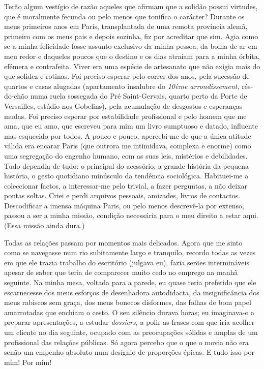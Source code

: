 Terão algum vestígio de razão aqueles que afirmam que a solidão possui
virtudes, que é moralmente fecunda ou pelo menos que tonifica o
carácter? Durante os meus primeiros anos em Paris, transplantada de uma
remota província alemã, primeiro com os meus pais e depois sozinha, fiz
por acreditar que sim. Agia como se a minha felicidade fosse assunto
exclusivo da minha pessoa, da bolha de ar em meu redor e daqueles
poucos que o destino e os dias atraíam para a minha órbita, efémera e
contrafeita. Viver era uma espécie de artesanato que não exigia mais do
que solidez e rotinas. Foi preciso esperar pelo correr dos anos, pela
sucessão de quartos e casas alugadas (apartamento insalubre do
\emph{10ème arrondissement, }rés-do-chão
numa ruela sossegada do Pré Saint-Gervais, quarto perto da Porte de
Versailles, estúdio nos Gobelins), pela acumulação de desgostos e
esperanças mudas. Foi preciso esperar por estabilidade profissional e
pelo homem que me ama, que eu amo, que escreveu para mim um livro
sumptuoso e datado, influente mas esquecido por todos. A pouco e pouco,
apercebi-me de que a única atitude válida era encarar Paris (que outrora me
intimidava, complexa e enorme) como uma segregação do engenho humano,
com as suas leis, mistérios e debilidades. Tudo dependia de tudo: o
principal do acessório, a grande história da pequena história, o gesto
quotidiano minúsculo da tendência sociológica. Habituei-me a coleccionar
factos, a interessar-me pelo trivial, a fazer perguntas, a não deixar
pontas soltas. Criei e perdi arquivos pessoais, amizades, livros de
contactos. Descodificar a imensa máquina Paris, ou pelo menos
descrevê-la por extenso, passou a ser a minha missão, condição
necessária para o meu direito a estar aqui. (Essa missão ainda dura.)

Todas as relações passam por momentos mais delicados. Agora que me sinto
como se navegasse num rio subitamente largo e tranquilo, recordo todas
as vezes em que ele trazia trabalho do escritório (julgava eu), fazia
serões intermináveis apesar de saber que teria de comparecer muito cedo
no emprego na manhã seguinte. Na minha mesa, voltada para a parede, eu
quase teria preferido que ele escarnecesse dos meus esforços de
desenhadora autodidacta, da insignificância dos meus rabiscos sem graça,
dos meus bonecos disformes, das folhas de bom papel amarrotadas que
enchiam o cesto. O seu silêncio durava horas; eu imaginava-o a
preparar apresentações, a estudar \emph{dossiers, }a polir as frases com
que iria acolher um cliente no dia seguinte, ocupado com as preocupações
sólidas e amplas
de um profissional das relações públicas. Só agora percebo que o que o
movia não era senão um empenho absoluto num desígnio de proporções
épicas. E tudo isso por mim! Por mim!

